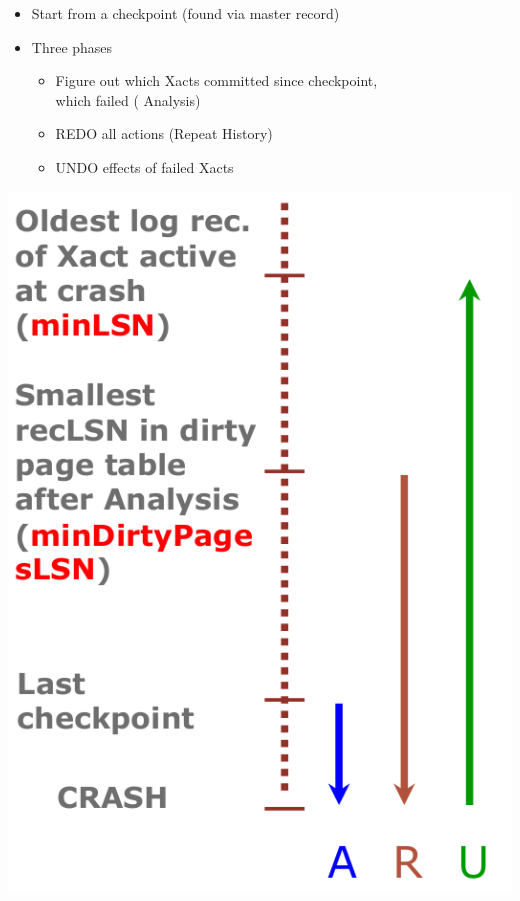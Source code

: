 \begin{minipage}{0.365\textwidth}
  \begin{itemize}
  \item Start from a checkpoint (found via master record)
  \item Three phases
    \begin{itemize}
    \item Figure out which Xacts committed since checkpoint, \\
      which failed ({\color{blue} Analysis})
    \item {\color{brown} REDO} all actions (Repeat History)
    \item {\color{green} UNDO} effects of failed Xacts
    \end{itemize}
  \end{itemize}
\end{minipage}%
\begin{minipage}{0.2\textwidth}
  \includegraphics[scale=0.1]{graphics/crash-recovery-phases.png}
\end{minipage}

